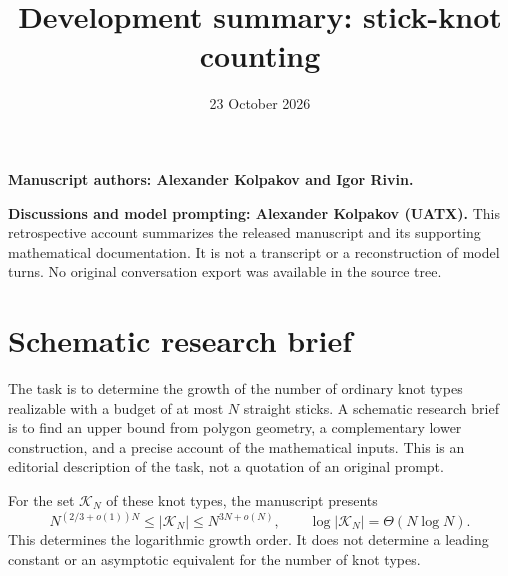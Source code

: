 \documentclass[11pt]{article}
\title{Development summary: stick-knot counting}
\author{}
\date{23 October 2026}
\begin{document}
\maketitle
\noindent\textbf{Manuscript authors: Alexander Kolpakov and Igor Rivin.}

\noindent\textbf{Discussions and model prompting: Alexander Kolpakov (UATX).}
This retrospective account summarizes the released manuscript and its
supporting mathematical documentation. It is not a transcript or a reconstruction of model
turns. No original conversation export was available in the source tree.

\section*{Schematic research brief}
The task is to determine the growth of the number of ordinary knot types
realizable with a budget of at most $N$ straight sticks. A schematic research
brief is to find an upper bound from polygon geometry, a complementary lower
construction, and a precise account of the mathematical inputs. This is an
editorial description of the task, not a quotation of an original prompt.

For the set $\mathcal K_N$ of these knot types, the manuscript presents
\[
 N^{(2/3+o(1))N}\le |\mathcal K_N|\le N^{3N+o(N)},
 \qquad \log |\mathcal K_N|=\Theta(N\log N).
\]
This determines the logarithmic growth order. It does not determine a leading
constant or an asymptotic equivalent for the number of knot types.
\end{document}
